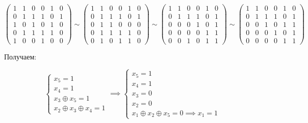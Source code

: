\documentclass{article}
\begin{document}
$$
\begin{pmatrix}
    1 & 1 & 0 & 0 & 1 & 0 \\
    0 & 1 & 1 & 1 & 0 & 1 \\
    1 & 0 & 1 & 0 & 1 & 0 \\
    0 & 1 & 1 & 1 & 1 & 0 \\
    1 & 0 & 0 & 1 & 0 & 0
\end{pmatrix} \sim
\begin{pmatrix}
    1 & 1 & 0 & 0 & 1 & 0 \\
    0 & 1 & 1 & 1 & 0 & 1 \\
    0 & 1 & 1 & 0 & 0 & 0 \\
    0 & 1 & 1 & 1 & 1 & 0 \\
    0 & 1 & 0 & 1 & 1 & 0
\end{pmatrix} \sim
\begin{pmatrix}
    1 & 1 & 0 & 0 & 1 & 0 \\
    0 & 1 & 1 & 1 & 0 & 1 \\
    0 & 0 & 0 & 1 & 0 & 1 \\
    0 & 0 & 0 & 0 & 1 & 1 \\
    0 & 0 & 1 & 0 & 1 & 1
\end{pmatrix} \sim
\begin{pmatrix}
    1 & 1 & 0 & 0 & 1 & 0 \\
    0 & 1 & 1 & 1 & 0 & 1 \\
    0 & 0 & 1 & 0 & 1 & 1 \\
    0 & 0 & 0 & 1 & 0 & 1 \\
    0 & 0 & 0 & 0 & 1 & 1
\end{pmatrix}
$$

Получаем:

\begin{equation}
    \begin{cases}
        x_5 = 1 \\
        x_4 = 1 \\
        x_3 \oplus x_5 = 1 \\
        x_2 \oplus x_3 \oplus x_4 = 1
    \end{cases} \implies \begin{cases}
        x_5 = 1 \\
        x_4 = 1 \\
        x_3 = 0 \\
        x_2 = 0 \\
        x_1 \oplus x_2 \oplus x_5 = 0 \implies x_1 = 1
    \end{cases}
\end{equation}
\end{document}
